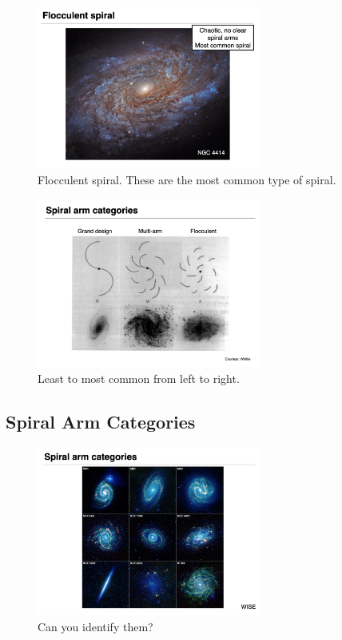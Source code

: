 \documentclass{article}
\begin{document}
\begin{figure}
    \centering
    \includegraphics[width=0.66\textwidth]{figs/Screen Shot 2021-10-27 at 10.01.23 AM.png}
    \caption{Flocculent spiral. These are the most common type of spiral. }
    \label{fig:flocculent_spiral}
\end{figure}

\begin{figure}
    \centering
    \includegraphics[width=0.66\textwidth]{figs/Screen Shot 2021-10-27 at 10.01.58 AM.png}
    \caption{Least to most common from left to right.}
    \label{fig:more_Tpyes}
\end{figure}

\subsection{Spiral Arm Categories}

\begin{figure}
    \centering
    \includegraphics[width=0.66\textwidth]{figs/Screen Shot 2021-10-27 at 10.03.02 AM.png}
    \caption{Can you identify them?}
    \label{fig:boomboom}
\end{figure}
\end{document}

